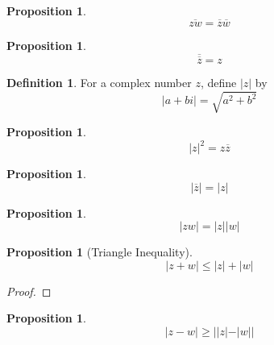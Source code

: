 \documentclass{article}
\let\qed\relax
\newtheorem{proposition}[axiom]{Proposition}
\theoremstyle{definition}
\newtheorem{definition}[axiom]{Definition}
\begin{document}
    \begin{proposition}
        \[ \overline{zw} = \overline{z} \overline{w} \]
    \end{proposition}

    \begin{proposition}
        \[ \overline{\overline{z}} = z \]
    \end{proposition}

    \begin{definition}
        For a complex number $z$, define $|z|$ by
        \[ |a+bi| = \sqrt{a^2 + b^2} \]
    \end{definition}

    \begin{proposition}
        \[ |z|^2 = z \overline{z} \]
    \end{proposition}

    \begin{proposition}
        \[ |\overline{z}| = |z| \]
    \end{proposition}

    \begin{proposition}
        \[ |zw| = |z| |w| \]
    \end{proposition}

    \begin{proposition}[Triangle Inequality]
        \[ |z+w| \leq |z| + |w| \]
    \end{proposition}

    \begin{proof}
        \pf
        \qed
    \end{proof}

    \begin{proposition}
        \[ |z-w| \geq ||z|-|w|| \]
    \end{proposition}
    
\end{document}
